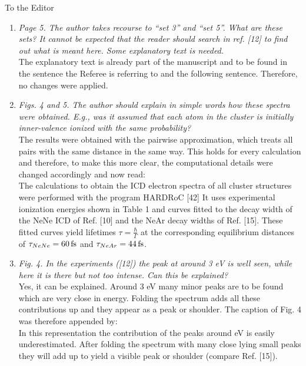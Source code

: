 \documentclass[DIN,pagenumber=false,parskip=half,fromalign=left,fromphone=true,fromemail=true,fromurl=false,fromlogo=false,fromrule=false]{scrlttr2}
\begin{document}
\begin{letter}{To the Editor}
\begin{enumerate}
 \item \emph{Page 5. The author takes recourse to “set 3” and “set 5”. What are these sets? It cannot be expected that the reader should search in ref. [12] to find out what is meant here. Some explanatory text is needed.}\\
       The explanatory text is already part of the manuscript and to be found
       in the sentence the Referee is referring to and the following sentence.
       Therefore, no changes were applied.

 \item \emph{Figs. 4 and 5. The author should explain in simple words how these spectra were obtained. E.g., was it assumed that each atom in the cluster is initially inner-valence ionized with the same probability?}\\
       The results were obtained with the pairwise approximation, which treats
       all pairs with the same distance in the same way. This holds for every
       calculation and therefore, to make this more clear, the computational
       details were changed accordingly and now read:\\
The calculations to obtain the ICD electron spectra of all cluster
structures were performed with
the program HARDRoC [42]
{\color{blue}{based on the decomposition of the cluster into
pairs. Every pair with the same distance is treated equally. This includes the
assumption that every neon atom is ionized with the same probability.}}
It uses experimental ionization energies shown
in Table 1 and curves fitted to the decay width of the
NeNe ICD of Ref. [10] and the NeAr decay widths of Ref.
[15]. These fitted curves yield lifetimes
$\tau=\frac{\hbar}{\Gamma}$ at the corresponding equilibrium distances of         
$\tau_{NeNe}= \unit[60]{fs}$ and                                    
$\tau_{NeAr}= \unit[44]{fs}$.

 \item \emph{Fig. 4. In the experiments ([12]) the peak at around 3 eV is well seen, while here it is there but not too intense. Can this be explained?}\\
       Yes, it can be explained. Around 3 eV many minor peaks are to be found which
       are very close in energy. Folding the spectrum adds all these contributions
       up and they appear as a peak or shoulder. The caption of Fig. 4 was
       therefore appended by:\\
          In this representation the contribution of the
          peaks around \unit[3]{eV} is easily underestimated. After folding the
          spectrum with many close lying small peaks they will add up to yield
          a visible peak or shoulder (compare Ref. [15]).


\end{enumerate}
\end{letter}
\end{document}
